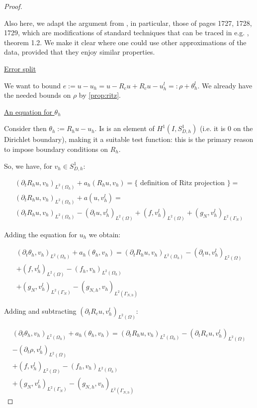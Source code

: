 \documentclass[english,a4paper,10pt,oneside]{scrbook}	%
\theoremstyle{break}
\newenvironment{mproof}[1][\proofname]{%
  \begin{proof}[#1]$ $\par\nobreak\ignorespaces
}{%
  \end{proof}
}
\renewcommand*{\proofname}{Proof}
\theoremstyle{remark}
\newcommand{\ind}[1]{\{\text{ #1 }\}}
\begin{document}
\begin{mproof}

Also here, we adapt the argument from \cite{ranner}, in particular, those of pages 1727, 1728, 1729, which are modifications of standard techniques that can be traced in e.g. \cite{thomee}, theorem 1.2. We make it clear where one could use other approximations of the data, provided that they enjoy similar properties.

\underline{Error split}

We want to bound $e:=u-u_h = u-R_cu +R_c u -u_h^l =: \rho + \theta_h^l$. We already have the needed bounds on $\rho$ by \cref{prop:ritz}.

\underline{An equation for $\theta_h$}

Consider then $\theta_h := R_h u -u_h$. Is is an element of $H^1(I,S^1_{D,h})$ (i.e. it is $0$ on the Dirichlet boundary), making it a suitable test function: this is the primary reason to impose boundary conditions on $R_h$.

So, we have, for $v_h \in S^1_{D,h}$:

\begin{align*}
(\partial_t R_h u , v_h)_{L^2(\Omega_h)} + a_h(R_h u, v_h) = \ind{definition of Ritz projection}=\\
(\partial_t R_h u , v_h)_{L^2(\Omega_h)} + a(u, v_h^l) =\\
(\partial_t R_h u , v_h)_{L^2(\Omega_h)} - (\partial_t u, v_h^l)_{L^2(\Omega)} + (f, v_h^l)_{L^2(\Omega)} + (g_{N}, v_h^l)_{L^2(\Gamma_{N})} 
\end{align*}

Adding the equation for $u_h$ we obtain:

\begin{align*}
(\partial_t \theta_h , v_h)_{L^2(\Omega_h)} + a_h(\theta_h, v_h) = 
(\partial_t R_h u , v_h)_{L^2(\Omega_h)} - (\partial_t u, v_h^l)_{L^2(\Omega)}\\ + (f, v_h^l)_{L^2(\Omega)} - (f_h, v_h)_{L^2(\Omega_h)}\\ + (g_{N}, v_h^l)_{L^2(\Gamma_{N})} - (g_{N,h}, v_h)_{L^2(\Gamma_{N,h})} 
\end{align*}

Adding and subtracting $(\partial_t R_cu, v_h^l)_{L^2(\Omega)}$:


\begin{align}
\label{eqn:theta}
(\partial_t \theta_h , v_h)_{L^2(\Omega_h)} + a_h(\theta_h, v_h) = 
(\partial_t R_h u , v_h)_{L^2(\Omega_h)} - (\partial_t R_c u , v_h^l)_{L^2(\Omega)}\\
- (\partial_t \rho, v_h^l)_{L^2(\Omega)}\\ + (f, v_h^l)_{L^2(\Omega)} - (f_h, v_h)_{L^2(\Omega_h)}\\ + (g_{N}, v_h^l)_{L^2(\Gamma_{N})} - (g_{N,h}, v_h)_{L^2(\Gamma_{N,h})} 
\end{align}


\end{mproof}
\end{document}
